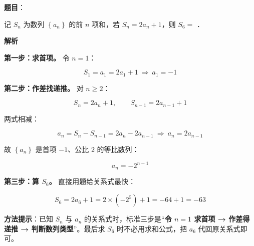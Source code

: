 \begin{answer}

\textbf{题目}：

记 $S_n$ 为数列 $\left\{a_n\right\}$ 的前 $n$ 项和，若 $S_n=2a_n+1$，则 $S_6=$ \gkblank{}．

\textbf{解析}

\textbf{第一步：求首项。} 令 $n=1$：

\nopagebreak[4]
\[S_1=a_1=2a_1+1\ \Longrightarrow\ a_1=-1\]

\textbf{第二步：作差找递推。} 对 $n\ge2$：

\nopagebreak[4]
\[S_n=2a_n+1,\qquad S_{n-1}=2a_{n-1}+1\]

两式相减：

\nopagebreak[4]
\[a_n=S_n-S_{n-1}=2a_n-2a_{n-1}\ \Longrightarrow\ a_n=2a_{n-1}\]

故 $\left\{a_n\right\}$ 是首项 $-1$、公比 $2$ 的等比数列：

\nopagebreak[4]
\[a_n=-2^{n-1}\]

\textbf{第三步：算 $S_6$。} 直接用题给关系式最快：

\nopagebreak[4]
\[S_6=2a_6+1=2\times\left(-2^{5}\right)+1=-64+1=-63\]

\begin{gktip}
\textbf{方法提示}：已知 $S_n$ 与 $a_n$ 的关系式时，标准三步是“\textbf{令 $n=1$ 求首项 → 作差得递推 → 判断数列类型}”。最后求 $S_6$ 时不必用求和公式，把 $a_6$ 代回原关系式即可。
\end{gktip}


\par\medskip

\end{answer}
